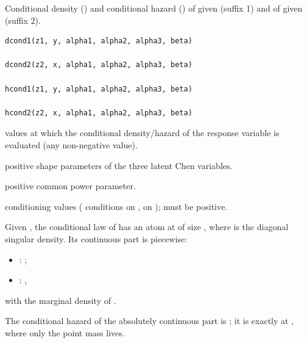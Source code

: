 \documentclass[11pt,a4paper]{article}
\begin{document}
\newpage

%
\begin{Description}
Conditional density () and conditional
hazard () of  given  (suffix 1)
and of  given  (suffix 2).
\end{Description}
%
\begin{Usage}
\begin{verbatim}
dcond1(z1, y, alpha1, alpha2, alpha3, beta)

dcond2(z2, x, alpha1, alpha2, alpha3, beta)

hcond1(z1, y, alpha1, alpha2, alpha3, beta)

hcond2(z2, x, alpha1, alpha2, alpha3, beta)
\end{verbatim}
\end{Usage}
%
\begin{Arguments}
\begin{ldescription}
\item[\code{z1}, \code{z2}] values at which the conditional density/hazard of the
response variable is evaluated (any non-negative value).

\item[\code{alpha1}, \code{alpha2}, \code{alpha3}] positive shape parameters of the three
latent Chen variables.

\item[\code{beta}] positive common power parameter.

\item[\code{x}, \code{y}] conditioning values ( conditions on
,  on ); must be positive.
\end{ldescription}
\end{Arguments}
%
\begin{Details}
Given , the conditional law of  has an
atom at  of size , where
 is the diagonal singular density.  Its continuous part is
piecewise:
\begin{itemize}

\item{} : ;
\item{} : ,

\end{itemize}

with  the marginal density of .

The conditional hazard of the absolutely continuous part is
; it is
 exactly at , where only the point mass lives.
\end{Details}
\end{document}
